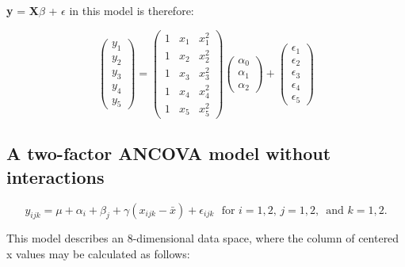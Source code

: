 \documentclass[11pt]{article}
\begin{document}
\textbf{y} = \textbf{X$\beta$} + \textbf{$\epsilon$}  in this model is therefore:

\[
\begin{pmatrix} y_1 \\ y_2 \\ y_3 \\ y_4\\ y_5\end{pmatrix}
 = \begin{pmatrix} 
                            1 & x_1 & x_1^2 \\ 
                            1 & x_2 & x_2^2 \\ 
                            1 & x_3 & x_3^2 \\ 
                            1 & x_4 & x_4^2 \\ 
                            1 & x_5 & x_5^2 \end{pmatrix} \begin{pmatrix} \alpha_0 \\ \alpha_1 \\ \alpha_2
\end{pmatrix} + \begin{pmatrix} \epsilon_1 \\ \epsilon_2 \\
\epsilon_3 \\ \epsilon_4 \\ \epsilon_5 \end{pmatrix}
\]
\subsection{A two-factor ANCOVA model without interactions}
\label{sec-1-2}

\[
y_{ijk} = \mu + \alpha_i + \beta_j + \gamma(x_{ijk} - \bar{x}) +
\epsilon_{ijk}\,\, \textrm{ for } i= 1, 2,\,j=1,2,\,\textrm{ and }k
=1,2.
\]

This model describes an 8-dimensional data space, where the column of
centered x values may be calculated as follows:
\end{document}
